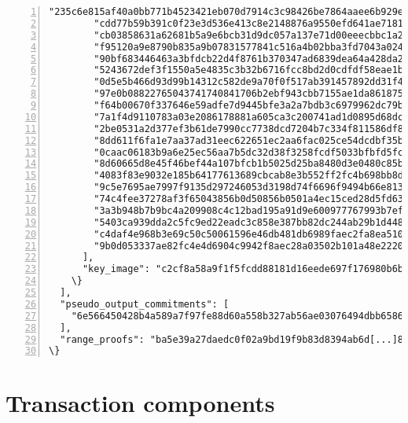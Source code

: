 \begin{appendices}
\begin{Verbatim}[commandchars=\\\{\}, numbers=left]
        "235c6e815af40a0bb771b4523421eb070d7914c3c98426be7864aaee6b929e0a",
        "cdd77b59b391c0f23e3d536e413c8e2148876a9550efd641ae71811693bc440e",
        "cb03858631a62681b5a9e6bcb31d9dc057a137e71d00eeecbbc1a2b035d33c0c",
        "f95120a9e8790b835a9b07831577841c516a4b02bba3fd7043a0243411208c0f",
        "90bf683446463a3bfdcb22d4f8761b370347ad6839dea64a428da274e872b50f",
        "5243672def3f1550a5e4835c3b32b6716fcc8bd2d0cdfdf58eae1bea2fc38409",
        "0d5e5b466d93d99b14312c582de9a70f0f517ab391457892dd31f411dba5de01",
        "97e0b08822765043741740841706b2ebf943cbb7155ae1da861875c0f9683000",
        "f64b00670f337646e59adfe7d9445bfe3a2a7bdb3c6979962dc79b531faf400c",
        "7a1f4d9110783a03e2086178881a605ca3c200741ad1d0895d68dcc0c3f8040f",
        "2be0531a2d377ef3b61de7990cc7738dcd7204b7c334f811586df87f659c8705",
        "8dd611f6fa1e7aa37ad31eec622651ec2aa6fac025ce54dcdbf35b257b441c09",
        "0caac06183b9a6e25ec56aa7b5dc32d38f3258fcdf5033bfbfd5fc1d8573b304",
        "8d60665d8e45f46bef44a107bfcb1b5025d25ba8480d3e0480c85b0cc2644507",
        "4083f83e9032e185b64177613689cbcab8e3b552ff2fc4b698bb8dda6bca6d0d",
        "9c5e7695ae7997f9135d297246053d3198d74f6696f9494b66e8137b27c2dd0a",
        "74c4fee37278af3f65043856b0d50856b0501a4ec15ced28d5fd63b77e97b10d",
        "3a3b948b7b9bc4a209908c4c12bad195a91d9e600977767993b7ef6db97de305",
        "5403ca939dda2c5fc9ed22eadc3c858e387bb82dc244ab29b1d448d94e639d04",
        "c4daf4e968b3e69c50c50061596e46db481db6989faec2fa8ea51061b7f96e00",
        "9b0d053337ae82fc4e4d6904c9942f8aec28a03502b101a48e2220adbf306206"
      ],
      "key_image": "c2cf8a58a9f1f5fcdd88181d16eede697f176980b6b[...]dee3dc79a3"
    \}
  ],
  "pseudo_output_commitments": [
    "6e566450428b4a589a7f97fe88d60a558b327ab56ae03076494dbb658675f00a"
  ],
  "range_proofs": "ba5e39a27daedc0f02a9bd19f9b83d8394ab6d[...]8f6ef8745e53a009"
\}
\end{Verbatim}



\section*{Transaction components}
	

\end{appendices}
